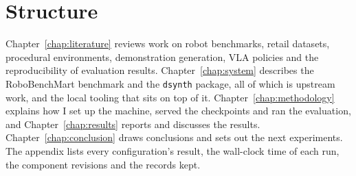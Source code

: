 \section{Structure}

Chapter~\ref{chap:literature} reviews work on robot benchmarks, retail datasets, procedural environments, demonstration generation, VLA policies and the reproducibility of evaluation results. Chapter~\ref{chap:system} describes the RoboBenchMart benchmark and the \texttt{dsynth} package, all of which is upstream work, and the local tooling that sits on top of it. Chapter~\ref{chap:methodology} explains how I set up the machine, served the checkpoints and ran the evaluation, and Chapter~\ref{chap:results} reports and discusses the results. Chapter~\ref{chap:conclusion} draws conclusions and sets out the next experiments. The appendix lists every configuration's result, the wall-clock time of each run, the component revisions and the records kept.

\endgroup
